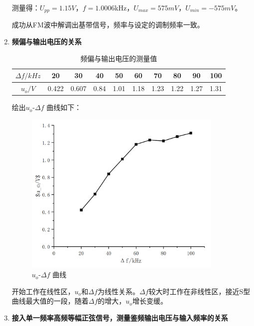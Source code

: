 \documentclass[UTF8]{ctexart}
\begin{document}
\begin{enumerate}[(1)]
    测量得：$U_{pp}=1.15V$，$f=1.0006$kHz，$U_{max}=575mV$，$U_{min}=-575mV$。

    成功从FM波中解调出基带信号，频率与设定的调制频率一致。

    \item \textbf{频偏与输出电压的关系}
    \begin{table}[H]
        \centering
        \caption{频偏与输出电压的测量值}
        
        \begin{tabular}{|c|c|c|c|c|c|c|c|c|c|}
        \hline
        $\Delta f/kHz$ & 20    & 30    & 40   & 50   & 60   & 70   & 80   & 90   & 100  \\ \hline
        $u_o/V$        & 0.422 & 0.607 & 0.84 & 1.01 & 1.18 & 1.23 & 1.22 & 1.27 & 1.31 \\ \hline
        \end{tabular}
    \end{table}

    绘出$u_o$-$\Delta f$ 曲线如下：

    \begin{figure}[H]
        \centering
        
        \includegraphics[width=0.9\textwidth]{pics/graph2.png}
        \caption{$u_o$-$\Delta f$ 曲线}\label{fig:graph2}
    \end{figure}

    开始工作在线性区，$u_o$和$\Delta f$为线性关系。$\Delta f$较大时工作在非线性区，接近S型曲线最大值的一段，随着$\Delta f$的增大，$u_o$增长变缓。

    \item \textbf{接入单一频率高频等幅正弦信号，测量鉴频输出电压与输入频率的关系}


\end{enumerate}
\end{document}
